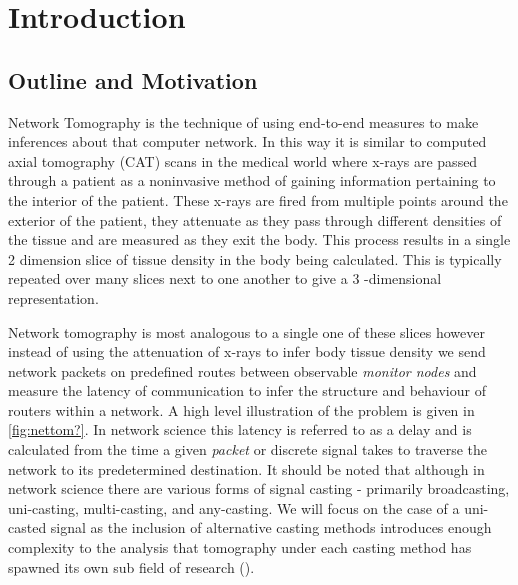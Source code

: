 \chapter{Introduction}
\label{cha:intro}


\newpage
\section{Outline and Motivation}
\label{sec:Imotivationandoutline}

Network Tomography is the technique of using end-to-end measures to make inferences about that computer network. In this way it is similar to computed axial tomography (CAT) scans in the medical world where x-rays are passed through a patient as a noninvasive method of gaining information pertaining to the interior of the patient. These x-rays are fired from multiple points around the exterior of the patient, they attenuate as they pass through different densities of the tissue and are measured as they exit the body. This process results in a single 2 dimension slice of tissue density in the body being calculated. This is typically repeated over many slices next to one another to give a 3 -dimensional representation.\par
Network tomography is most analogous to a single one of these slices however instead of using the attenuation of x-rays to infer body tissue density we send network packets on predefined routes between observable \textit{monitor nodes} and measure the latency of communication to infer the structure and behaviour of routers within a network. A high level illustration of the problem is given in \ref{fig:nettom?}. In network science this latency is referred to as a delay and is calculated from the time a given \textit{packet} or discrete signal takes to traverse the network to its predetermined destination. It should be noted that although in network science there are various forms of signal casting - primarily broadcasting, uni-casting, multi-casting, and any-casting. We will focus on the case of a uni-casted signal as the inclusion of alternative casting methods introduces enough complexity to the analysis that tomography under each casting method has spawned its own sub field of research (\cite{lawrence_network_2006}).\par
